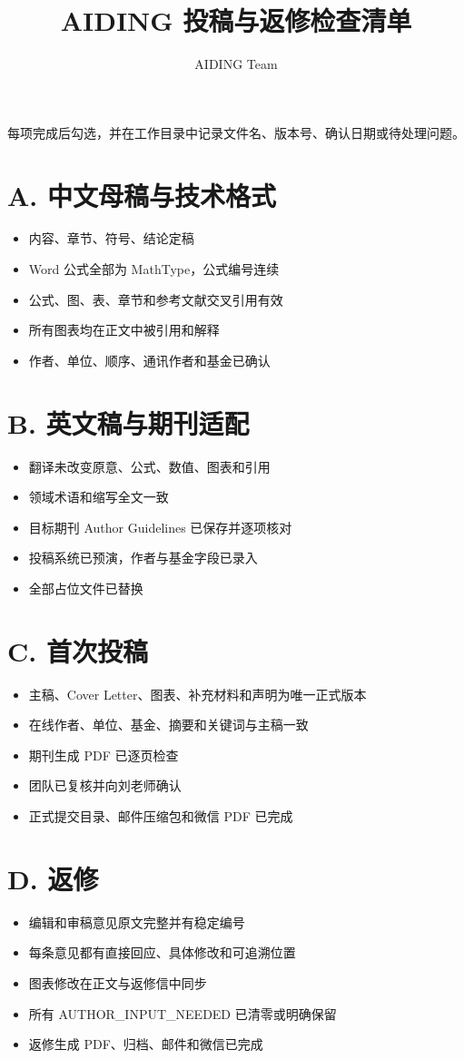 \documentclass[UTF8,11pt]{ctexart}
\title{\textcolor{aidinggreen}{AIDING 投稿与返修检查清单}}
\author{AIDING Team}
\date{}
\newcommand{\checkbox}{\ensuremath{\square}}
\begin{document}
\maketitle
每项完成后勾选，并在工作目录中记录文件名、版本号、确认日期或待处理问题。
\section{A. 中文母稿与技术格式}
\begin{itemize}
\item[\checkbox] 内容、章节、符号、结论定稿
\item[\checkbox] Word 公式全部为 MathType，公式编号连续
\item[\checkbox] 公式、图、表、章节和参考文献交叉引用有效
\item[\checkbox] 所有图表均在正文中被引用和解释
\item[\checkbox] 作者、单位、顺序、通讯作者和基金已确认
\end{itemize}
\section{B. 英文稿与期刊适配}
\begin{itemize}
\item[\checkbox] 翻译未改变原意、公式、数值、图表和引用
\item[\checkbox] 领域术语和缩写全文一致
\item[\checkbox] 目标期刊 Author Guidelines 已保存并逐项核对
\item[\checkbox] 投稿系统已预演，作者与基金字段已录入
\item[\checkbox] 全部占位文件已替换
\end{itemize}
\section{C. 首次投稿}
\begin{itemize}
\item[\checkbox] 主稿、Cover Letter、图表、补充材料和声明为唯一正式版本
\item[\checkbox] 在线作者、单位、基金、摘要和关键词与主稿一致
\item[\checkbox] 期刊生成 PDF 已逐页检查
\item[\checkbox] 团队已复核并向刘老师确认
\item[\checkbox] 正式提交目录、邮件压缩包和微信 PDF 已完成
\end{itemize}
\section{D. 返修}
\begin{itemize}
\item[\checkbox] 编辑和审稿意见原文完整并有稳定编号
\item[\checkbox] 每条意见都有直接回应、具体修改和可追溯位置
\item[\checkbox] 图表修改在正文与返修信中同步
\item[\checkbox] 所有 AUTHOR\_INPUT\_NEEDED 已清零或明确保留
\item[\checkbox] 返修生成 PDF、归档、邮件和微信已完成
\end{itemize}
\end{document}
